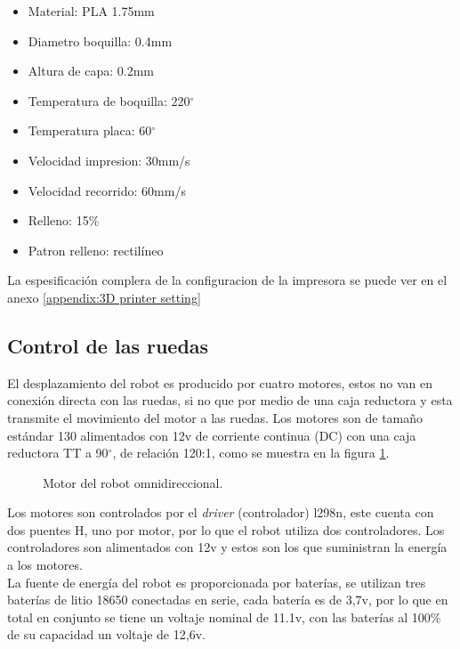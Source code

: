 \documentclass{iccmemoria}
\begin{document}
\begin{itemize}
	\item Material: PLA 1.75mm
	\item Diametro boquilla: 0.4mm
	\item Altura de capa: 0.2mm
	\item Temperatura de boquilla: 220$^{\circ}$
	\item Temperatura placa: 60$^{\circ}$
	\item Velocidad impresion: 30mm/s
	\item Velocidad recorrido: 60mm/s
	\item Relleno: 15\%
	\item Patron relleno: rectilíneo
\end{itemize}

La espesificación complera de la configuracion de la impresora se puede ver en el anexo \ref{appendix:3D printer setting}

\subsection{Control de las ruedas}

El desplazamiento del robot es producido por cuatro motores, estos no van en conexión directa con las ruedas, si no que por medio de una caja reductora y esta transmite el movimiento del motor a las ruedas. Los motores son de tamaño estándar 130 alimentados con 12v de corriente continua (DC) con una caja reductora TT a 90$^{\circ}$, de relación 120:1, como se muestra en la figura \ref{fig:motor}.\\

\begin{figure}[H]
  \centering
  
  \caption{Motor del robot omnidireccional.}
  \label{fig:motor}
\end{figure}

Los motores son controlados por el \emph{driver} (controlador) l298n, este cuenta con dos puentes H, uno por motor, por lo que el robot utiliza dos controladores. Los controladores son alimentados con 12v y estos son los que suministran la energía a los motores.\\

La fuente de energía del robot es proporcionada por baterías, se utilizan tres baterías de litio 18650 conectadas en serie, cada batería es de 3,7v, por lo que en total en conjunto se tiene un voltaje nominal de 11.1v, con las baterías al 100\% de su capacidad un voltaje de 12,6v.\\
\end{document}
